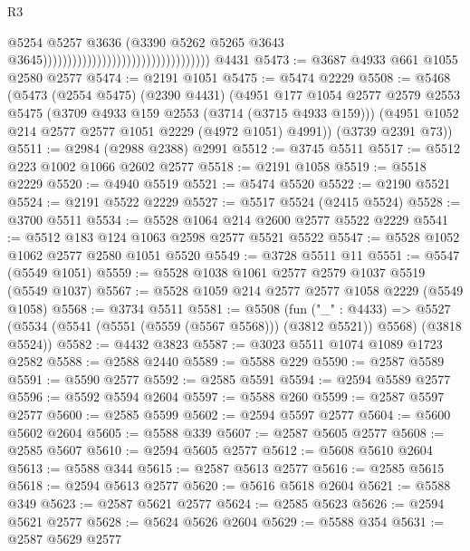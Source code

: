\begin{lexlean}{R3}
\begin{coremodule}
                                                                      @5254
                                                                      @5257
                                                                      @3636
                                                                      (@3390
                                                                        @5262
                                                                        @5265
                                                                        @3643
                                                                        @3645))))))))))))))))))))))))))))))))))
    @4431
@5473 := @3687 @4933 @661 @1055 @2580 @2577
@5474 := @2191 @1051
@5475 := @5474 @2229
@5508 := @5468
    (@5473
      (@2554 @5475)
      (@2390 @4431)
      (@4951
        @177
        @1054
        @2577
        @2579
        @2553
        @5475
        (@3709 @4933 @159 @2553 (@3714 (@3715 @4933 @159)))
        (@4951 @1052 @214 @2577 @2577 @1051 @2229 (@4972 @1051) @4991))
      (@3739 @2391 @73))
@5511 := @2984 (@2988 @2388) @2991
@5512 := @3745 @5511
@5517 := @5512 @223 @1002 @1066 @2602 @2577
@5518 := @2191 @1058
@5519 := @5518 @2229
@5520 := @4940 @5519
@5521 := @5474 @5520
@5522 := @2190 @5521
@5524 := @2191 @5522 @2229
@5527 := @5517 @5524 (@2415 @5524)
@5528 := @3700 @5511
@5534 := @5528 @1064 @214 @2600 @2577 @5522 @2229
@5541 := @5512 @183 @124 @1063 @2598 @2577 @5521 @5522
@5547 := @5528 @1052 @1062 @2577 @2580 @1051 @5520
@5549 := @3728 @5511 @11
@5551 := @5547 (@5549 @1051)
@5559 := @5528 @1038 @1061 @2577 @2579 @1037 @5519 (@5549 @1037)
@5567 := @5528 @1059 @214 @2577 @2577 @1058 @2229 (@5549 @1058)
@5568 := @3734 @5511
@5581 := @5508
    (fun ("_" : @4433) =>
    @5527 (@5534 (@5541 (@5551 (@5559 (@5567 @5568))) (@3812 @5521)) @5568) (@3818 @5524))
@5582 := @4432 @3823
@5587 := @3023 @5511 @1074 @1089 @1723 @2582
@5588 := @2588 @2440
@5589 := @5588 @229
@5590 := @2587 @5589
@5591 := @5590 @2577
@5592 := @2585 @5591
@5594 := @2594 @5589 @2577
@5596 := @5592 @5594 @2604
@5597 := @5588 @260
@5599 := @2587 @5597 @2577
@5600 := @2585 @5599
@5602 := @2594 @5597 @2577
@5604 := @5600 @5602 @2604
@5605 := @5588 @339
@5607 := @2587 @5605 @2577
@5608 := @2585 @5607
@5610 := @2594 @5605 @2577
@5612 := @5608 @5610 @2604
@5613 := @5588 @344
@5615 := @2587 @5613 @2577
@5616 := @2585 @5615
@5618 := @2594 @5613 @2577
@5620 := @5616 @5618 @2604
@5621 := @5588 @349
@5623 := @2587 @5621 @2577
@5624 := @2585 @5623
@5626 := @2594 @5621 @2577
@5628 := @5624 @5626 @2604
@5629 := @5588 @354
@5631 := @2587 @5629 @2577

\end{coremodule}
\end{lexlean}
